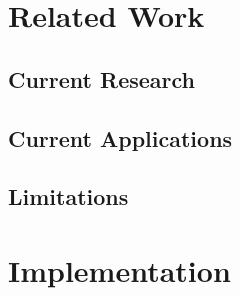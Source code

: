 \documentclass[12pt]{article}
\begin{document}
    \section{Related Work}\label{sec:related-work}


    \subsection{Current Research}\label{subsec:current-research}


    \subsection{Current Applications}\label{subsec:current-applications}


    \subsection{Limitations}\label{subsec:limitations}


    \pagebreak


    \section{Implementation}\label{sec:implementation}
\end{document}
